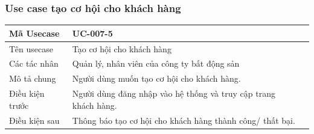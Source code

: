 \documentclass[12pt,a4paper]{article}
\begin{document}
    \subsubsection*{Use case tạo cơ hội cho khách hàng}
    \begin{table}[H]
        \centering
        \begin{tabular}{|p{3.5cm}|p{11.5cm}|c|}
            \hline
            Mã Usecase      & UC-007-5                                                        \\
            \hline
            Tên usecase     & Tạo cơ hội cho khách hàng                                       \\
            \hline
            Các tác nhân    & Quản lý, nhân viên của công ty bất động sản                     \\
            \hline
            Mô tả chung     & Người dùng muốn tạo cơ hội cho khách hàng.                      \\
            \hline

            Điều kiện trước & Người dùng đăng nhập vào hệ thống và truy cập trang khách hàng. \\
            \hline

            Điều kiện sau   & Thông báo tạo cơ hội cho khách hàng thành công/ thất bại.       \\
            \hline


\end{tabular}
\end{table}
\end{document}
